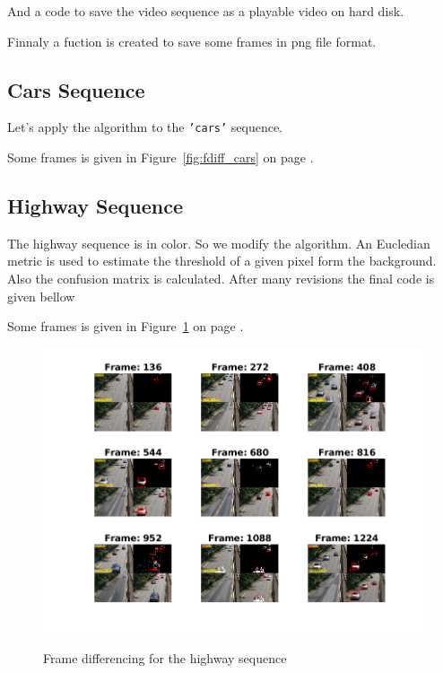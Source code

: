 \documentclass[a4paper,12pt]{article}
\begin{document}


And a code to save the video sequence as a playable video on hard disk.



Finnaly a fuction is created to save some frames in png file format.


\subsection{Cars Sequence}
Let's apply the algorithm to the \texttt{'cars'} sequence.


Some frames is given in Figure~\ref{fig:fdiff_cars} on page \pageref{fig:fdiff_cars}.

\subsection{Highway Sequence}

The highway sequence is in color. So we modify the algorithm. An Eucledian metric is used  to estimate the threshold of a given pixel form the background. Also the confusion matrix is calculated. After many revisions the final code is given bellow

\vspace{10pt}

\vspace{30pt}

Some frames is given in Figure~\ref{fig:fdiff_h} on page \pageref{fig:fdiff_h}.

\begin{figure}[Ht]
\centering
\includegraphics{../Videos/highway_frame_diff.png}
\label{fig:fdiff_h}
\caption{Frame differencing for the highway sequence}
\end{figure} 
\end{document}
